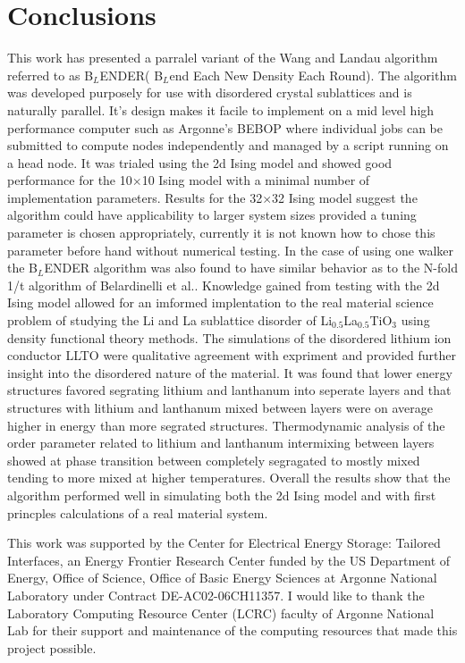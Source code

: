 \documentclass[aps,pre,reprint,superscriptaddress,showkeys]{revtex4-1}
\begin{document}
\section{Conclusions}
 This work has presented a parralel variant of the Wang and Landau algorithm referred to as B$_L$ENDER( B$_L$end Each New Density Each Round). The algorithm was developed purposely for use with disordered crystal sublattices and is naturally parallel. It's design makes it facile to implement on a mid level high performance computer such as Argonne's BEBOP where individual jobs can be submitted to compute nodes independently and managed by a script running on a head node. It was trialed using the 2d Ising model and showed good performance for the 10$\times$10 Ising model with a minimal number of implementation parameters. Results for the 32$\times$32 Ising model suggest the algorithm could have applicability to larger system sizes provided a tuning parameter is chosen appropriately, currently it is not known how to chose this parameter before hand without numerical testing.  In the case of using one walker the B$_L$ENDER algorithm was also found to have similar behavior as to the N-fold 1/t algorithm of Belardinelli et al.\cite{saturation}. Knowledge gained from testing with the 2d Ising model allowed for an imformed implentation to the real material science problem of studying the Li and La sublattice disorder of Li$_{0.5}$La$_{0.5}$TiO$_{3}$ using density functional theory methods. The simulations of the disordered lithium ion conductor LLTO were qualitative agreement with expriment and provided further insight into the disordered nature of the material. It was found that lower energy structures favored segrating lithium and lanthanum into seperate layers and that structures with lithium and lanthanum mixed between layers were on average higher in energy than more segrated structures. Thermodynamic analysis of the order parameter related to lithium and lanthanum intermixing between layers showed at phase transition between completely segragated  to mostly mixed tending to more mixed at higher temperatures. Overall the results show that the algorithm performed well in simulating both the 2d Ising model and with first princples calculations of a real material system. 

\begin{acknowledgments}
This work was supported by the Center for Electrical Energy Storage: Tailored Interfaces, an Energy Frontier Research Center funded 
by the US Department of Energy, Office of Science, Office of Basic Energy Sciences at Argonne National Laboratory under Contract DE-AC02-06CH11357.
I would like to thank the Laboratory Computing Resource Center (LCRC) faculty of Argonne National Lab for their support and maintenance of the computing resources that made this project possible. 
\end{acknowledgments}

%


\end{document}
